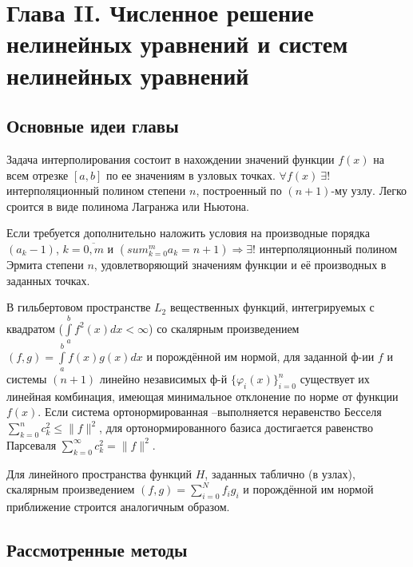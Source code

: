 \newpage
{}
\pagestyle{empty}
\vspace{0.5cm}

\section*{Глава II. Численное решение нелинейных уравнений и систем нелинейных уравнений}

\subsection{Основные идеи главы} 

    Задача интерполирования состоит в нахождении значений функции $f(x)$
    на всем отрезке $[a,b]$ по ее значениям в узловых точках. $\forall f(x)~\exists!$ интерполяционный полином степени $n$, построенный по $(n+1)$-му узлу. Легко сроится в виде полинома Лагранжа или Ньютона.

Если требуется дополнительно наложить условия на производные порядка $(a_k-1)$, $k = \overline{0,m}$ и $(sum_{k=0}^m a_k = n + 1) \Rightarrow \exists!$ интерполяционный полином Эрмита степени $n$, удовлетворяющий значениям функции и её производных в заданных точках.

В гильбертовом пространстве $L_2$ вещественных функций, интегрируемых с квадратом ($\int\limits_a^b{f^2(x)dx} < \infty$) со скалярным произведением $(f,g)=\int\limits_a^b{f(x)g(x)dx}$ и порождённой им нормой, для заданной ф-ии $f$ и системы $(n+1)$ линейно независимых ф-й $\{\varphi_i(x)\}_{i=0}^n$ существует их линейная комбинация, имеющая минимальное отклонение по норме от функции $f(x)$. Если система ортонормированная –выполняется неравенство Бесселя $\sum_{k=0}^n c_k^2 \leqslant \|f\|^2$, для ортонормированного базиса достигается равенство Парсеваля $\sum_{k=0}^\infty c_k^2 = \|f\|^2.$

Для линейного пространства функций $H$, заданных таблично (в узлах),  скалярным произведением $(f,g) = \sum\limits_{i=0}^N f_i g_i$ и порождённой им нормой приближение строится аналогичным образом.

\subsection{Рассмотренные методы}
